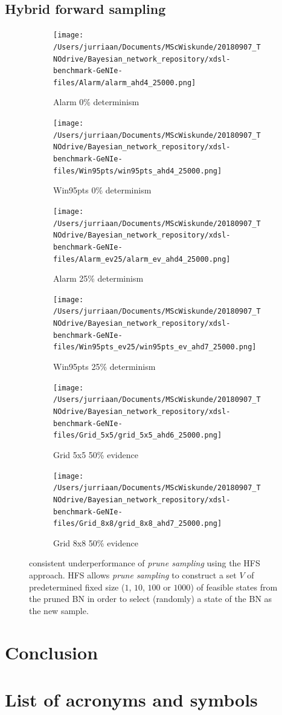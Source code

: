 \documentclass[a4paper, twoside, 11pt]{report}
\theoremstyle{plain}
\theoremstyle{definition}
\theoremstyle{remark}
\newcommand{\ps}{\textit{prune sampling }}
\begin{document}
\section{Hybrid forward sampling}
\begin{figure}[h!]
\centering

\begin{subfigure}{.5\linewidth}
\texttt{[image: /Users/jurriaan/Documents/MScWiskunde/20180907\_TNOdrive/Bayesian\_network\_repository/xdsl-benchmark-GeNIe-files/Alarm/alarm\_ahd4\_25000.png]}
\caption{Alarm 0\% determinism}%
\label{alarm_ev}%
\end{subfigure}\hfill%
\begin{subfigure}{.5\linewidth}
\texttt{[image: /Users/jurriaan/Documents/MScWiskunde/20180907\_TNOdrive/Bayesian\_network\_repository/xdsl-benchmark-GeNIe-files/Win95pts/win95pts\_ahd4\_25000.png]}
\caption{Win95pts 0\% determinism}%
\label{win95pts_ev}%
\end{subfigure}

\begin{subfigure}{.5\linewidth}
\texttt{[image: /Users/jurriaan/Documents/MScWiskunde/20180907\_TNOdrive/Bayesian\_network\_repository/xdsl-benchmark-GeNIe-files/Alarm\_ev25/alarm\_ev\_ahd4\_25000.png]}
\caption{Alarm 25\% determinism}%
\label{grid_3x3}%
\end{subfigure}\hfill%
\begin{subfigure}{.5\linewidth}
\texttt{[image: /Users/jurriaan/Documents/MScWiskunde/20180907\_TNOdrive/Bayesian\_network\_repository/xdsl-benchmark-GeNIe-files/Win95pts\_ev25/win95pts\_ev\_ahd7\_25000.png]}
\caption{Win95pts 25\% determinism}%
\label{grid_5x5}%
\end{subfigure}

\begin{subfigure}{.5\linewidth}
\texttt{[image: /Users/jurriaan/Documents/MScWiskunde/20180907\_TNOdrive/Bayesian\_network\_repository/xdsl-benchmark-GeNIe-files/Grid\_5x5/grid\_5x5\_ahd6\_25000.png]}
\caption{Grid 5x5 50\% evidence}%
\label{grid_3x3}%
\end{subfigure}\hfill%
\begin{subfigure}{.5\linewidth}
\texttt{[image: /Users/jurriaan/Documents/MScWiskunde/20180907\_TNOdrive/Bayesian\_network\_repository/xdsl-benchmark-GeNIe-files/Grid\_8x8/grid\_8x8\_ahd7\_25000.png]}
\caption{Grid 8x8 50\% evidence}%
\label{grid_5x5}%
\end{subfigure}

\vspace{0.75pc}
\caption{consistent underperformance of \ps using the \gls{HFS} approach. HFS allows \ps to construct a set $V$ of predetermined fixed size ($1$, $10$, $100$ or $1000$) of feasible states from the pruned BN in order to select (randomly) a state of the BN as the new sample.}
\label{results1}
\end{figure}

\chapter{Conclusion}

\newpage
\chapter*{List of acronyms and symbols}
\printglossaries



\end{document}
